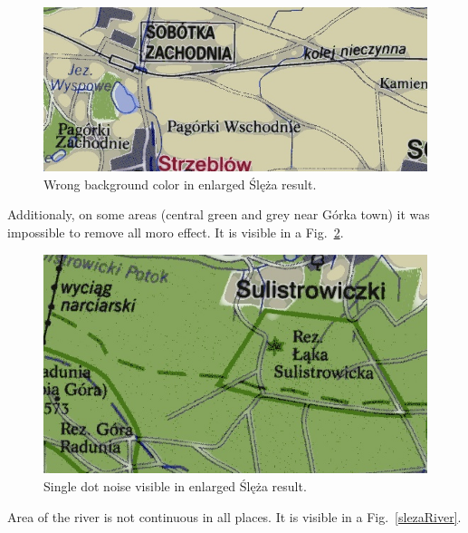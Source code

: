 \documentclass[a4paper,onecolumn,oneside,12pt]{memoir}
\begin{document}
\begin{figure}[!ht]
\begin{center}
\includegraphics[scale=0.5]{images/badBackgroundSleza.png}
\caption{Wrong background color in enlarged Ślęża result.}
\label{badBackgroundSleza}
\end{center}
\end{figure}

Additionaly, on some areas (central green and grey near Górka town) it was
impossible to remove all moro effect. It is visible in a Fig.~\ref{moroSlezaIO}.

\begin{figure}[!ht]
\begin{center}
\includegraphics[scale=0.5]{images/moroSlezaResult.png}
\caption{Single dot noise visible in enlarged Ślęża result.}
\label{moroSlezaIO}
\end{center}
\end{figure}

Area of the river is not continuous in all places. It is visible in a Fig.~\ref{slezaRiver}.
\end{document}
